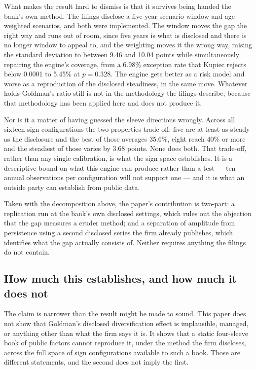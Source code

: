 What makes the result hard to dismiss is that it survives being handed the
bank's own method. The filings disclose a five-year scenario window and
age-weighted scenarios, and both were implemented. The window moves the gap the
right way and runs out of room, since five years is what is disclosed and there
is no longer window to appeal to, and the weighting moves it the wrong way,
raising the standard deviation to between 9.46 and 10.04 points while
simultaneously repairing the engine's coverage, from a 6.98\% exception rate
that Kupiec rejects below 0.0001 to 5.45\% at $p = 0.328$. The engine gets
better as a risk model and worse as a reproduction of the disclosed steadiness,
in the same move. Whatever holds Goldman's ratio still is not in the
methodology the filings describe, because that methodology has been applied
here and does not produce it.

Nor is it a matter of having guessed the sleeve directions wrongly. Across all
sixteen sign configurations the two properties trade off: five are at least as
steady as the disclosure and the best of those averages 35.6\%, eight reach
40\% or more and the steadiest of those varies by 3.68 points. None does both.
That trade-off, rather than any single calibration, is what the sign space
establishes. It is a descriptive bound on what this engine can produce rather
than a test --- ten annual observations per configuration will not support one
--- and it is what an outside party can establish from public data.

Taken with the decomposition above, the paper's contribution is two-part: a
replication run at the bank's own disclosed settings, which rules out the
objection that the gap measures a cruder method; and a separation of amplitude
from persistence using a second disclosed series the firm already publishes,
which identifies what the gap actually consists of. Neither requires anything
the filings do not contain.

\subsection*{How much this establishes, and how much it does not}

The claim is narrower than the result might be made to sound. This paper does
not show that Goldman's disclosed diversification effect is implausible,
managed, or anything other than what the firm says it is. It shows that a
static four-sleeve book of public factors cannot reproduce it, under the
method the firm discloses, across the full space of sign configurations
available to such a book. Those are different statements, and the second does
not imply the first.

